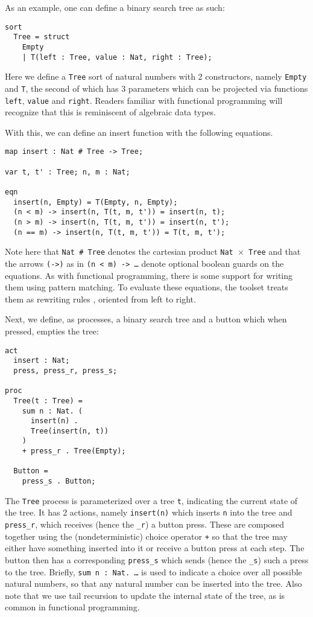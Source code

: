 \documentclass{article}
\begin{document}
As an example, one can define a binary search tree as such:
\begin{verbatim}
sort
  Tree = struct
    Empty
    | T(left : Tree, value : Nat, right : Tree);
\end{verbatim}
Here we define a \texttt{Tree} sort of natural numbers with 2 constructors,
namely \texttt{Empty} and \texttt{T}, the second of which has 3 parameters which
can be projected via functions \texttt{left}, \texttt{value} and \texttt{right}.
Readers familiar with functional programming will recognize that this is
reminiscent of algebraic data types.

With this, we can define an insert function with the following equations.

\begin{verbatim}
map insert : Nat # Tree -> Tree;

var t, t' : Tree; n, m : Nat;

eqn
  insert(n, Empty) = T(Empty, n, Empty);
  (n < m) -> insert(n, T(t, m, t')) = insert(n, t);
  (n > m) -> insert(n, T(t, m, t')) = insert(n, t');
  (n == m) -> insert(n, T(t, m, t')) = T(t, m, t');
\end{verbatim}

Note here that \texttt{Nat \# Tree} denotes the cartesian product
\texttt{Nat $\times$ Tree} and that the arrows \texttt{(->)} as in
\texttt{(n < m) -> \dots} denote optional boolean guards on the equations.
As with functional programming, there is some support for writing them using
pattern matching.
To evaluate these equations, the toolset treats them as rewriting rules
\cite{mcrl_rewriting}, oriented from left to right.

Next, we define, as processes, a binary search tree and a button which
when pressed, empties the tree:

\begin{verbatim}
act
  insert : Nat;
  press, press_r, press_s;

proc
  Tree(t : Tree) =
    sum n : Nat. (
      insert(n) .
      Tree(insert(n, t))
    )
    + press_r . Tree(Empty);

  Button =
    press_s . Button;
\end{verbatim}

The \texttt{Tree} process is parameterized over a tree \texttt{t}, indicating
the current state of the tree.
It has 2 actions, namely \texttt{insert(n)} which inserts \texttt{n} into the
tree and \texttt{press\_r}, which receives (hence the \texttt{\_r}) a button
press.
These are composed together using the (nondeterministic) choice operator
\texttt{+} so that the
tree may either have something inserted into it or receive a button press at
each step.
The button then has a corresponding \texttt{press\_s} which sends
(hence the \texttt{\_s}) such a press to the tree.
Briefly, \texttt{sum n : Nat. \dots} is used to indicate a
choice over all possible natural numbers, so that any natural number can be
inserted into the tree.
Also note that we use tail recursion to update the internal state of the tree,
as is common in functional programming.
\end{document}
